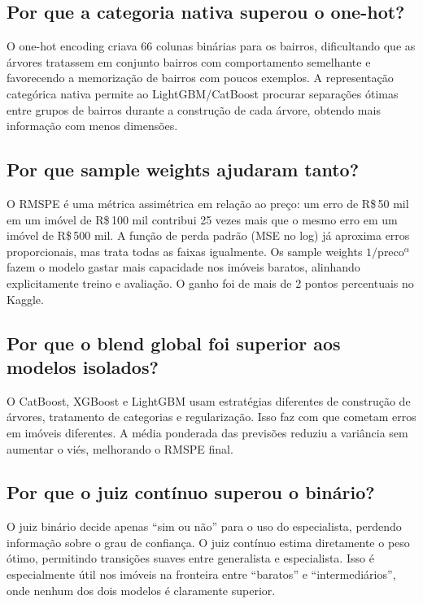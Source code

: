 \documentclass[12pt,a4paper]{article}
\begin{document}
\subsection{Por que a categoria nativa superou o one-hot?}

O one-hot encoding criava 66 colunas binárias para os bairros, dificultando que as árvores tratassem em conjunto bairros com comportamento semelhante e favorecendo a memorização de bairros com poucos exemplos. A representação categórica nativa permite ao LightGBM/CatBoost procurar separações ótimas entre grupos de bairros durante a construção de cada árvore, obtendo mais informação com menos dimensões.

\subsection{Por que sample weights ajudaram tanto?}

O RMSPE é uma métrica assimétrica em relação ao preço: um erro de R\$\,50 mil em um imóvel de R\$\,100 mil contribui 25 vezes mais que o mesmo erro em um imóvel de R\$\,500 mil. A função de perda padrão (MSE no log) já aproxima erros proporcionais, mas trata todas as faixas igualmente. Os sample weights $1/\text{preco}^\alpha$ fazem o modelo gastar mais capacidade nos imóveis baratos, alinhando explicitamente treino e avaliação. O ganho foi de mais de 2 pontos percentuais no Kaggle.

\subsection{Por que o blend global foi superior aos modelos isolados?}

O CatBoost, XGBoost e LightGBM usam estratégias diferentes de construção de árvores, tratamento de categorias e regularização. Isso faz com que cometam erros em imóveis diferentes. A média ponderada das previsões reduziu a variância sem aumentar o viés, melhorando o RMSPE final.

\subsection{Por que o juiz contínuo superou o binário?}

O juiz binário decide apenas ``sim ou não'' para o uso do especialista, perdendo informação sobre o grau de confiança. O juiz contínuo estima diretamente o peso ótimo, permitindo transições suaves entre generalista e especialista. Isso é especialmente útil nos imóveis na fronteira entre ``baratos'' e ``intermediários'', onde nenhum dos dois modelos é claramente superior.
\end{document}
